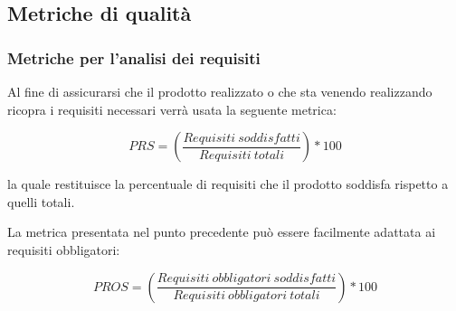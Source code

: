 \subsection{Metriche di qualità}
\subsubsection{Metriche per l'analisi dei requisiti}
Al fine di assicurarsi che il prodotto realizzato o che sta venendo realizzando ricopra i requisiti necessari verrà usata la seguente metrica:
\begin{center}
\[PRS = (\frac{Requisiti\ soddisfatti}{Requisiti\ totali})*100\]
\end{center}
la quale restituisce la percentuale di requisiti che il prodotto soddisfa rispetto a quelli totali.

La metrica presentata nel punto precedente può essere facilmente adattata ai requisiti obbligatori:
\begin{center}
\[PROS=(\frac{Requisiti\ obbligatori\ soddisfatti}{Requisiti\ obbligatori\ totali})*100\]
\end{center}

